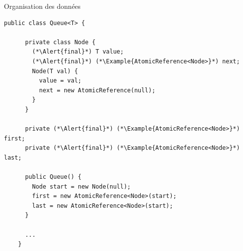 
\begingroup

\begin{frame}[fragile]{Organisation des données}

  \begin{lstlisting}[gobble=4]
    public class Queue<T> {

      private class Node {
        (*\Alert{final}*) T value;
        (*\Alert{final}*) (*\Example{AtomicReference<Node>}*) next;
        Node(T val) {
          value = val;
          next = new AtomicReference(null);
        }
      }
      
      private (*\Alert{final}*) (*\Example{AtomicReference<Node>}*) first;
      private (*\Alert{final}*) (*\Example{AtomicReference<Node>}*) last;
      
      public Queue() {
        Node start = new Node(null);
        first = new AtomicReference<Node>(start);
        last = new AtomicReference<Node>(start);
      }

      ...
    }
  \end{lstlisting}

  
\end{frame}

\endgroup
\endinput
